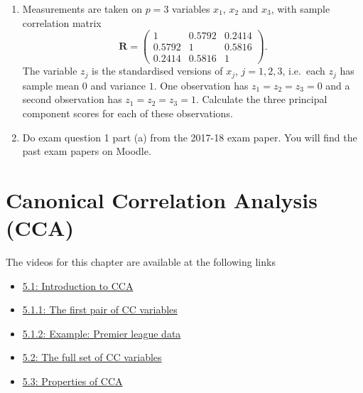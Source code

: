 \documentclass[]{book}
\providecommand{\tightlist}{%
  \setlength{\itemsep}{0pt}\setlength{\parskip}{0pt}}
\theoremstyle{definition}
\theoremstyle{definition}
\theoremstyle{definition}
\theoremstyle{remark}
\begin{document}
\begin{enumerate}
\def\labelenumi{\arabic{enumi}.}
\setcounter{enumi}{3}
\item
  Measurements are taken on \(p=3\) variables \(x_1\), \(x_2\) and \(x_3\), with sample correlation matrix
  \[
   \mathbf R= \begin{pmatrix} 1 & 0.5792 & 0.2414 \\ 0.5792 & 1 & 0.5816 \\ 0.2414 & 0.5816 & 1 \end{pmatrix}.
  \]
  The variable \(z_j\) is the standardised versions of \(x_j\), \(j=1,2,3\), i.e.~each \(z_j\) has sample mean \(0\) and variance \(1\).
  One observation has \(z_1 = z_2 = z_3 = 0\) and a second observation has \(z_1 = z_2 = z_3 =1\). Calculate the three
  principal component scores for
  each of these observations.
\item
  Do exam question 1 part (a) from the 2017-18 exam paper. You will find the past exam papers on Moodle.
\end{enumerate}

\hypertarget{cca}{%
\chapter{Canonical Correlation Analysis (CCA)}\label{cca}}

The videos for this chapter are available at the following links

\begin{itemize}
\tightlist
\item
  \href{https://mediaspace.nottingham.ac.uk/media/CCA+Introduction/1_qhk7v35f}{5.1: Introduction to CCA}
\item
  \href{https://mediaspace.nottingham.ac.uk/media/CCAA+First+CC/1_yjm6kkxf}{5.1.1: The first pair of CC variables}
\item
  \href{https://mediaspace.nottingham.ac.uk/media/CCAA+Football+Example/1_r2v6924j}{5.1.2: Example: Premier league data}
\item
  \href{https://mediaspace.nottingham.ac.uk/media/CCAA+Full+Set/1_xmdoi9i6}{5.2: The full set of CC variables}
\item
  \href{https://mediaspace.nottingham.ac.uk/media/CCA\%3A\%20Properties/1_g24h27bj}{5.3: Properties of CCA}
\end{itemize}
\end{document}
